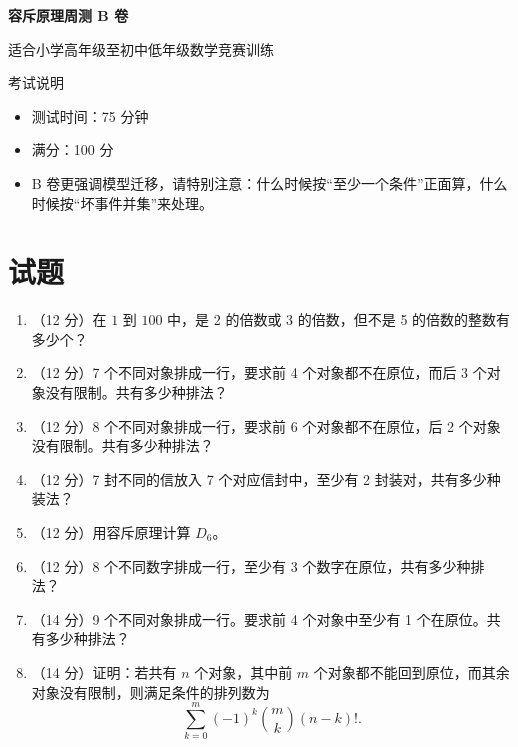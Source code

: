 \documentclass[11pt,a4paper,fontset=fandol]{ctexart}
\newcommand{\answerspace}{\vspace{2.3cm}}
\newcommand{\biganswerspace}{\vspace{3.2cm}}
\begin{document}
\thispagestyle{empty}
\begin{center}
{\fontsize{22}{28}\selectfont\bfseries 容斥原理周测 B 卷\par}
\vspace{0.4cm}
{\large 适合小学高年级至初中低年级数学竞赛训练\par}
\end{center}

\begin{infobox}{考试说明}
\begin{itemize}
  \item 测试时间：75 分钟
  \item 满分：100 分
  \item B 卷更强调模型迁移，请特别注意：什么时候按“至少一个条件”正面算，什么时候按“坏事件并集”来处理。
\end{itemize}
\end{infobox}

\section{试题}

\begin{enumerate}
  \item （12 分）在 $1$ 到 $100$ 中，是 2 的倍数或 3 的倍数，但不是 5 的倍数的整数有多少个？
  \answerspace

  \item （12 分）7 个不同对象排成一行，要求前 4 个对象都不在原位，而后 3 个对象没有限制。共有多少种排法？
  \biganswerspace

  \item （12 分）8 个不同对象排成一行，要求前 6 个对象都不在原位，后 2 个对象没有限制。共有多少种排法？
  \biganswerspace

  \item （12 分）7 封不同的信放入 7 个对应信封中，至少有 2 封装对，共有多少种装法？
  \answerspace

  \item （12 分）用容斥原理计算 $D_6$。
  \answerspace

  \item （12 分）8 个不同数字排成一行，至少有 3 个数字在原位，共有多少种排法？
  \biganswerspace

  \item （14 分）9 个不同对象排成一行。要求前 4 个对象中至少有 1 个在原位。共有多少种排法？
  \biganswerspace

  \item （14 分）证明：若共有 $n$ 个对象，其中前 $m$ 个对象都不能回到原位，而其余对象没有限制，则满足条件的排列数为
  \[
  \sum_{k=0}^{m}(-1)^k\binom{m}{k}(n-k)!.
  \]
  \biganswerspace
\end{enumerate}
\end{document}
